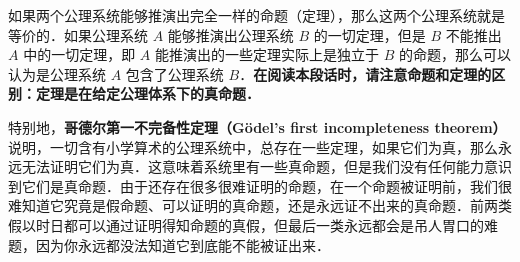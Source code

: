 如果两个公理系统能够推演出完全一样的命题（定理），那么这两个公理系统就是等价的．如果公理系统 $A$ 能够推演出公理系统 $B$ 的一切定理，但是 $B$ 不能推出 $A$ 中的一切定理，即 $A$ 能推演出的一些定理实际上是独立于 $B$ 的命题，那么可以认为是公理系统 $A$ 包含了公理系统 $B$．\textbf{在阅读本段话时，请注意命题和定理的区别：定理是在给定公理体系下的真命题．}

特别地，\textbf{哥德尔第一不完备性定理（Gödel's first incompleteness theorem）}说明，一切含有小学算术的公理系统中，总存在一些定理，如果它们为真，那么永远无法证明它们为真．这意味着系统里有一些真命题，但是我们没有任何能力意识到它们是真命题．由于还存在很多很难证明的命题，在一个命题被证明前，我们很难知道它究竟是假命题、可以证明的真命题，还是永远证不出来的真命题．前两类假以时日都可以通过证明得知命题的真假，但最后一类永远都会是吊人胃口的难题，因为你永远都没法知道它到底能不能被证出来．
